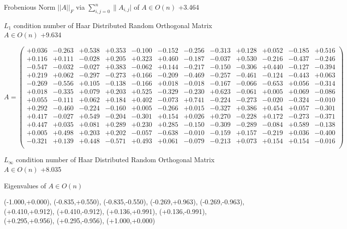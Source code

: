\documentclass[9pt]{article}
\theoremstyle{plain}
\theoremstyle{definition}
\theoremstyle{remark}
\numberwithin{equation}{section}
\begin{document}
Frobenious Norm  $||A||_{\textit{F}}$ via $\sum\limits_{i,j =0}^{n} \|A_{i,j}|$   of  $A \in O(n)$  +3.464

$L_1$ condition number of Haar Distributed Random Orthogonal Matrix $A \in O(n)$ +9.634

$A = \left(
\begin{array}{
cccccccccccc}
+0.036 & -0.263 & +0.538 & +0.353 & -0.100 & -0.152 & -0.256 & -0.313 & +0.128 & +0.052 & -0.185 & +0.516 \\
+0.116 & +0.111 & -0.028 & +0.205 & +0.323 & +0.460 & -0.187 & -0.037 & +0.530 & -0.216 & -0.437 & -0.246 \\
-0.547 & -0.032 & -0.027 & +0.383 & -0.062 & +0.144 & -0.217 & -0.150 & -0.306 & +0.440 & -0.127 & -0.394 \\
+0.219 & +0.062 & -0.297 & -0.273 & +0.166 & -0.209 & -0.469 & -0.257 & -0.461 & -0.124 & -0.443 & +0.063 \\
-0.269 & -0.556 & +0.105 & -0.138 & -0.166 & +0.018 & -0.018 & -0.167 & -0.066 & -0.653 & +0.056 & -0.314 \\
+0.018 & -0.335 & +0.079 & +0.203 & +0.525 & -0.329 & -0.230 & +0.623 & -0.061 & +0.005 & +0.069 & -0.086 \\
+0.055 & -0.111 & +0.062 & +0.184 & +0.402 & -0.073 & +0.741 & -0.224 & -0.273 & -0.020 & -0.324 & -0.010 \\
+0.292 & -0.460 & -0.224 & -0.160 & +0.005 & -0.266 & +0.015 & -0.327 & +0.386 & +0.454 & +0.057 & -0.301 \\
+0.417 & -0.027 & +0.549 & -0.204 & -0.301 & +0.154 & +0.026 & +0.270 & -0.228 & +0.172 & -0.273 & -0.371 \\
+0.447 & +0.035 & +0.081 & +0.289 & +0.230 & +0.285 & -0.150 & -0.309 & -0.289 & -0.084 & +0.589 & -0.138 \\
+0.005 & +0.498 & +0.203 & +0.202 & -0.057 & -0.638 & -0.010 & -0.159 & +0.157 & -0.219 & +0.036 & -0.400 \\
-0.321 & +0.139 & +0.448 & -0.571 & +0.493 & +0.061 & -0.079 & -0.213 & +0.073 & +0.154 & +0.154 & -0.016 \\
\end{array}
\right)$ \newline 

$L_{\infty}$ condition number of Haar Distributed Random Orthogonal Matrix $A \in O(n)$ +8.035

Eigenvalues of $A \in O(n)$

(-1.000,+0.000), (-0.835,+0.550), (-0.835,-0.550), (-0.269,+0.963), (-0.269,-0.963), (+0.410,+0.912), (+0.410,-0.912), (+0.136,+0.991), (+0.136,-0.991), (+0.295,+0.956), (+0.295,-0.956), (+1.000,+0.000)
\end{document}
